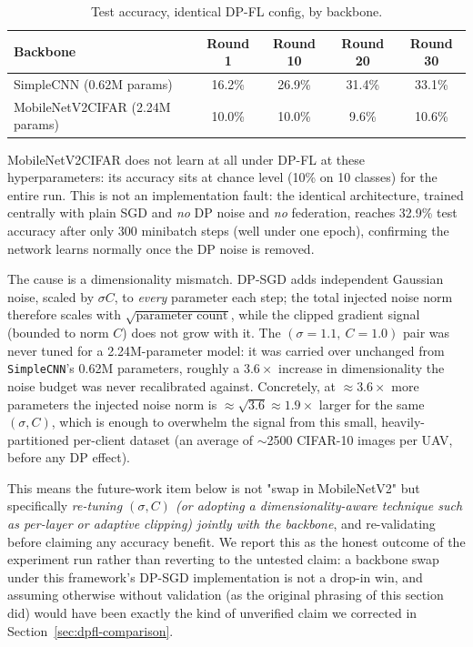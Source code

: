 \documentclass[12pt,a4paper]{article}
\begin{document}
\begin{table}[H]
  \centering
  \caption{Test accuracy, identical DP-FL config, by backbone.}
  \label{tab:mobilenet-negative}
  \begin{tabular}{lcccc}
    \toprule
    Backbone & Round 1 & Round 10 & Round 20 & Round 30\\
    \midrule
    SimpleCNN (0.62M params) & 16.2\% & 26.9\% & 31.4\% & 33.1\%\\
    MobileNetV2CIFAR (2.24M params) & 10.0\% & 10.0\% & 9.6\% & 10.6\%\\
    \bottomrule
  \end{tabular}
\end{table}

MobileNetV2CIFAR does not learn at all under DP-FL at these hyperparameters:
its accuracy sits at chance level (10\% on 10 classes) for the entire
run. This is not an implementation fault: the identical architecture, trained
centrally with plain SGD and \emph{no} DP noise and \emph{no} federation,
reaches 32.9\% test accuracy after only 300 minibatch steps (well under one
epoch), confirming the network learns normally once the DP noise is removed.

The cause is a dimensionality mismatch. DP-SGD adds independent Gaussian
noise, scaled by $\sigma C$, to \emph{every} parameter each step; the total
injected noise norm therefore scales with $\sqrt{\text{parameter count}}$,
while the clipped gradient signal (bounded to norm $C$) does not grow with
it. The $(\sigma=1.1,\ C=1.0)$ pair was never tuned for a 2.24M-parameter
model: it was carried over unchanged from \texttt{SimpleCNN}'s 0.62M
parameters, roughly a $3.6\times$ increase in dimensionality the noise
budget was never recalibrated against. Concretely, at $\approx3.6\times$ more
parameters the injected noise norm is $\approx\sqrt{3.6}\approx1.9\times$
larger for the same $(\sigma, C)$, which is enough to overwhelm the signal
from this small, heavily-partitioned per-client dataset (an average of
$\sim$2500 CIFAR-10 images per UAV, before any DP effect).

This means the future-work item below is not "swap in MobileNetV2" but
specifically \emph{re-tuning $(\sigma, C)$ (or adopting a
dimensionality-aware technique such as per-layer or adaptive clipping)
jointly with the backbone}, and re-validating before claiming any accuracy
benefit. We report this as the honest outcome of the experiment run rather
than reverting to the untested claim: a backbone swap under this framework's
DP-SGD implementation is not a drop-in win, and assuming otherwise without
validation (as the original phrasing of this section did) would have been
exactly the kind of unverified claim we corrected in
Section~\ref{sec:dpfl-comparison}.
\end{document}
